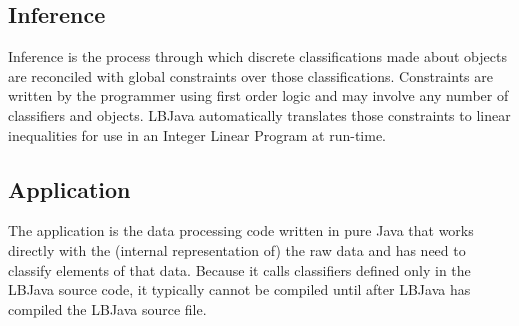\subsection*{Inference}
Inference is the process through which discrete classifications made about
objects are reconciled with global constraints over those classifications.
Constraints are written by the programmer using first order logic and may
involve any number of classifiers and objects.  LBJava automatically translates
those constraints to linear inequalities for use in an Integer Linear Program
at run-time.

\subsection*{Application}
The application is the data processing code written in pure Java that works
directly with the (internal representation of) the raw data and has need to
classify elements of that data.  Because it calls classifiers defined only in
the LBJava source code, it typically cannot be compiled until after LBJava has
compiled the LBJava source file.

